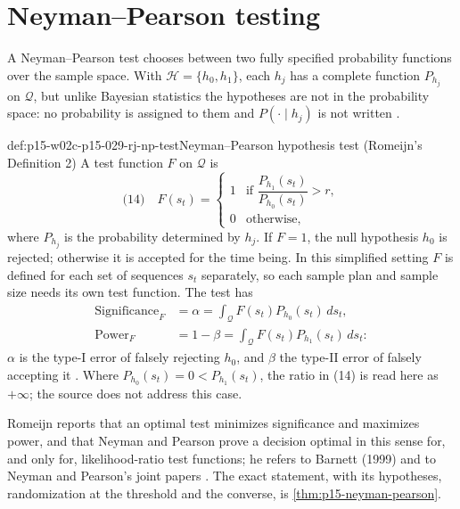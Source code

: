 \section{Neyman--Pearson testing}
\label{sec:p15-w02c-p15-029-rj-np}

A Neyman--Pearson test chooses between two fully specified probability
functions over the sample space. With \(\mathcal H=\{h_0,h_1\}\), each
\(h_j\) has a complete function \(P_{h_j}\) on \(\mathcal Q\), but
unlike Bayesian statistics the hypotheses are not in the probability
space: no probability is assigned to them and \(P(\cdot\mid h_j)\) is not
written \cite[pp.~637--638]{Romeijn2011InductiveLogicStatistics}.

\begin{hbdefinition}{def:p15-w02c-p15-029-rj-np-test}{Neyman--Pearson hypothesis test (Romeijn's Definition 2)}
A test function \(F\) on \(\mathcal Q\) is
\[
 \text{(14)}\quad F(s_t)=\begin{cases}1&\text{if }\dfrac{P_{h_1}(s_t)}{P_{h_0}(s_t)}>r,\\[1ex]0&\text{otherwise,}\end{cases}
\]
where \(P_{h_j}\) is the probability determined by \(h_j\). If \(F=1\),
the null hypothesis \(h_0\) is rejected; otherwise it is accepted for
the time being. In this simplified setting \(F\) is defined for each
set of sequences \(s_t\) separately, so each sample plan and sample size
needs its own test function. The test has
\begin{align*}
 \text{Significance}_F&=\alpha=\int_{\mathcal Q}F(s_t)P_{h_0}(s_t)\,ds_t,\\
 \text{Power}_F&=1-\beta=\int_{\mathcal Q}F(s_t)P_{h_1}(s_t)\,ds_t:
\end{align*}
\(\alpha\) is the type-I error of falsely rejecting \(h_0\), and
\(\beta\) the type-II error of falsely accepting it
\cite[p.~638]{Romeijn2011InductiveLogicStatistics}. Where
\(P_{h_0}(s_t)=0<P_{h_1}(s_t)\), the ratio in (14) is read here as
\(+\infty\); the source does not address this case.
\end{hbdefinition}

Romeijn reports that an optimal test minimizes significance and
maximizes power, and that Neyman and Pearson prove a decision optimal
in this sense for, and only for, likelihood-ratio test functions; he
refers to Barnett (1999) and to Neyman and Pearson's joint papers
\cite[p.~638]{Romeijn2011InductiveLogicStatistics}. The exact
statement, with its hypotheses, randomization at the threshold and the
converse, is \cref{thm:p15-neyman-pearson}.

